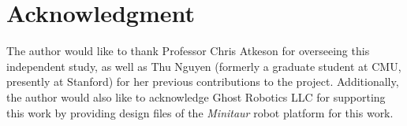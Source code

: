 \documentclass[conference,11pt,letterpaper]{IEEEtran}
\begin{document}
\section*{Acknowledgment}

The author would like to thank Professor Chris Atkeson for overseeing this independent study, as well as Thu Nguyen (formerly a graduate student at CMU, presently at Stanford) for her previous contributions to the project. Additionally, the author would also like to acknowledge Ghost Robotics LLC for supporting this work by providing design files of the \emph{Minitaur} robot platform for this work. 

\nocite{*}
\printbibliography

\end{document}
